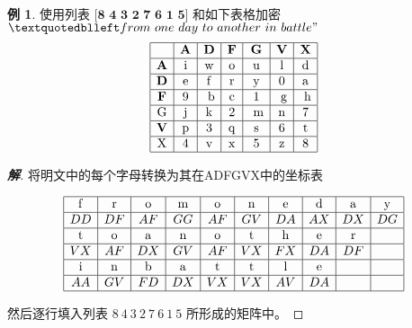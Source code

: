 \documentclass{article}
\theoremstyle{definition}
\newtheorem{example}{\indent 例}
\newenvironment{solution}{\begin{proof}[\indent\bf 解]}{\end{proof}}
\begin{document}
~\\

\begin{example}

使用列表$\textbf{ [8\ 4\ 3\ 2\ 7\ 6\ 1\ 5] }$和如下表格加密\textit{$“from\ one\ day\ to\ another\ in\ battle"$}
$$
\begin{array}{|c|c|c|c|c|c|c|}
\hline & \mathbf{A} & \mathbf{D} & \mathbf{F} & \mathbf{G} & \mathbf{V} & \mathbf{X} \\
\hline \mathbf{A} & \mathrm{i} & \mathrm{w} & \mathrm{o} & \mathrm{u} & \mathrm{l} & \mathrm{d} \\
\hline \mathbf{D} & \mathrm{e} & \mathrm{f} & \mathrm{r} & \mathrm{y} & 0 & \mathrm{a} \\
\hline \mathbf{F} & 9 & \mathrm{~b} & \mathrm{c} & 1 & \mathrm{~g} & \mathrm{~h} \\
\hline \mathrm{G} & \mathrm{j} & \mathrm{k} & 2 & \mathrm{~m} & \mathrm{n} & 7 \\
\hline \mathbf{V} & \mathrm{p} & 3 & \mathrm{q} & \mathrm{s} & 6 & \mathrm{t} \\
\hline \mathrm{X} & 4 & \mathrm{v} & \mathrm{x} & 5 & \mathrm{z} & 8 \\
\hline
\end{array}\\
$$

\begin{solution}



将明文中的每个字母转换为其在ADFGVX中的坐标表

$$
\begin{array}{|c|c|c|c|c|c|c|c|c|c|}
\hline \mathrm{f} & \mathrm{r} & \mathrm{o} & \mathrm{m} & \mathrm{o} & \mathrm{n} & \mathrm{e} & \mathrm{d} & \mathrm{a} & \mathrm{y} \\
\hline DD& DF& AF& GG& AF& GV& DA& AX& DX&DG \\
\hline \mathrm{t} & \mathrm{o} & \mathrm{a} & \mathrm{n} & \mathrm{o} & \mathrm{t} & \mathrm{h} & \mathrm{e} & \mathrm{r} & \\
\hline VX& AF& DX& GV& AF& VX& FX& DA& DF& \\
\hline \mathrm{i} & \mathrm{n} & \mathrm{b} & \mathrm{a} & \mathrm{t} & \mathrm{t} & \mathrm{l} & \mathrm{e} & & \\
\hline AA& GV& FD& DX& VX& VX& AV& DA& & \\
\hline
\end{array}\\
$$

然后逐行填入列表\textbf{ $8\ 4\ 3\ 2\ 7\ 6\ 1\ 5$ }所形成的矩阵中。


\end{solution}
\end{example}
\end{document}
